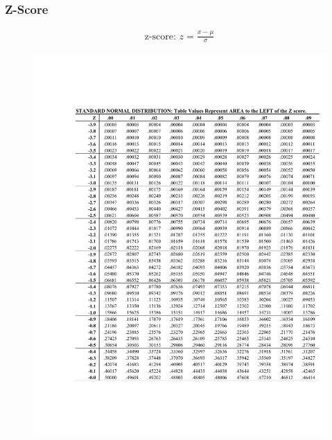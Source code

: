 \documentclass[12pt]{article}
\numberwithin{equation}{section}
\begin{document}
\subsubsection{Z-Score}
\begin{gather}
    \text{z-score: } z = \frac{x-\mu}{\sigma}
\end{gather}

\begin{figure}[!ht]
    \centering
    \includegraphics[page=1, width=0.9\linewidth, trim=4cm 4cm 1.25cm 4cm]{standardnormaltable.pdf}
    \label{zscore}
\end{figure}
\end{document}
